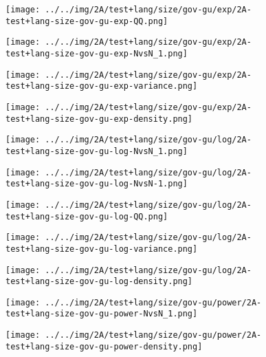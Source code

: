 \begin{figure}[H]
\centering	\texttt{[image: ../../img/2A/test+lang/size/gov-gu/exp/2A-test+lang-size-gov-gu-exp-QQ.png]}
\end{figure}
\begin{figure}[H]
\centering	\texttt{[image: ../../img/2A/test+lang/size/gov-gu/exp/2A-test+lang-size-gov-gu-exp-NvsN\_1.png]}
\end{figure}
\begin{figure}[H]
\centering	\texttt{[image: ../../img/2A/test+lang/size/gov-gu/exp/2A-test+lang-size-gov-gu-exp-variance.png]}
\end{figure}
\begin{figure}[H]
\centering	\texttt{[image: ../../img/2A/test+lang/size/gov-gu/exp/2A-test+lang-size-gov-gu-exp-density.png]}
\end{figure}
\begin{figure}[H]
\centering	\texttt{[image: ../../img/2A/test+lang/size/gov-gu/log/2A-test+lang-size-gov-gu-log-NvsN\_1.png]}
\end{figure}
\begin{figure}[H]
\centering	\texttt{[image: ../../img/2A/test+lang/size/gov-gu/log/2A-test+lang-size-gov-gu-log-NvsN-1.png]}
\end{figure}
\begin{figure}[H]
\centering	\texttt{[image: ../../img/2A/test+lang/size/gov-gu/log/2A-test+lang-size-gov-gu-log-QQ.png]}
\end{figure}
\begin{figure}[H]
\centering	\texttt{[image: ../../img/2A/test+lang/size/gov-gu/log/2A-test+lang-size-gov-gu-log-variance.png]}
\end{figure}
\begin{figure}[H]
\centering	\texttt{[image: ../../img/2A/test+lang/size/gov-gu/log/2A-test+lang-size-gov-gu-log-density.png]}
\end{figure}
\begin{figure}[H]
\centering	\texttt{[image: ../../img/2A/test+lang/size/gov-gu/power/2A-test+lang-size-gov-gu-power-NvsN\_1.png]}
\end{figure}
\begin{figure}[H]
\centering	\texttt{[image: ../../img/2A/test+lang/size/gov-gu/power/2A-test+lang-size-gov-gu-power-density.png]}
\end{figure}
